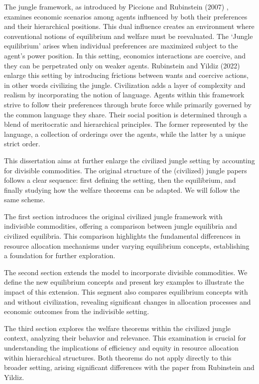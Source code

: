 \documentclass[12pt,a4paper]{article}
\numberwithin{theorem}{section}
\numberwithin{definition}{section}
\numberwithin{example}{section}
\numberwithin{exercise}{section}
\begin{document}
The jungle framework, as introduced by Piccione and Rubinstein (2007) \cite[PR]{P-R}, examines economic scenarios among agents influenced by both their preferences and their hierarchical positions. This dual influence creates an environment where conventional notions of equilibrium and welfare must be reevaluated. The `Jungle equilibrium' arises when individual preferences are maximized subject to the agent's power position. In this setting, economics interactions are coercive, and they can be perpetrated only on weaker agents. Rubinstein and Yildiz (2022) \cite[RY]{RY} enlarge this setting by introducing frictions between wants and coercive actions, in other words civilizing the jungle. Civilization adds a layer of complexity and realism by incorporating the notion of language. Agents within this framework strive to follow their preferences through brute force while primarily governed by the common language they share. Their social position is determined through a blend of meritocratic and hierarchical principles. The former represented by the language, a collection of orderings over the agents, while the latter by a unique strict order.

This dissertation aims at further enlarge the civilized jungle setting by accounting for divisible commodities. The original structure of the (civilized) jungle papers follows a clear sequence: first defining the setting, then the equilibrium, and finally studying how the welfare theorems can be adapted. We will follow the same scheme.

The first section introduces the original civilized jungle framework with indivisible commodities, offering a comparison between jungle equilibria and civilized equilibria. This comparison highlights the fundamental differences in resource allocation mechanisms under varying equilibrium concepts, establishing a foundation for further exploration.

The second section extends the model to incorporate divisible commodities. We define the new equilibrium concepts and present key examples to illustrate the impact of this extension. This segment also compares equilibrium concepts with and without civilization, revealing significant changes in allocation processes and economic outcomes from the indivisible setting.

The third section explores the welfare theorems within the civilized jungle context, analyzing their behavior and relevance. This examination is crucial for understanding the implications of efficiency and equity in resource allocation within hierarchical structures. Both theorems do not apply directly to this broader setting, arising significant differences with the paper from Rubinstein and Yildiz.
\end{document}
